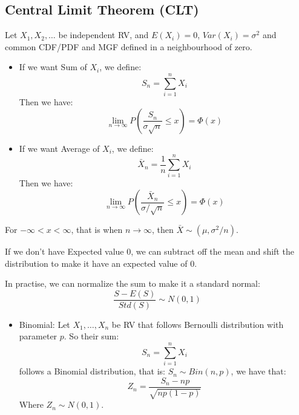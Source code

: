 \documentclass[12pt]{article}
\begin{document}
\begin{multicols*}{4}
    \section{Central Limit Theorem (CLT)}
    Let $X_1, X_2, \dots$ be independent RV, and $E(X_i)=0$, $Var(X_i)=\sigma^2$ and common CDF/PDF and MGF defined in a neighbourhood of zero.
    \begin{itemize}[leftmargin=*]
        \item If we want Sum of $X_i$, we define:
              $$S_n=\sum_{i=1}^nX_i$$
              Then we have:
              $$\lim_{n\to\infty}P\left(\frac{S_n}{\sigma\sqrt{n}}\leq x\right)=\Phi(x)$$
        \item If we want Average of $X_i$, we define:
              $$\bar X_n=\frac{1}{n}\sum_{i=1}^nX_i$$
              Then we have:
              $$\lim_{n\to\infty}P\left(\frac{\bar X_n}{\sigma/\sqrt{n}}\leq x\right)=\Phi(x)$$
    \end{itemize}
    For $-\infty<x<\infty$, that is when $n\to\infty$, then $\bar X\sim(\mu, \sigma^2/n)$.\par
    If we don't have Expected value $0$, we can subtract off the mean and shift the distribution to make it have an expected value of $0$.
    \begin{tcolorbox}[title=Normal Approximation]
        In practise, we can normalize the sum to make it a standard normal:
        $$\frac{S-E(S)}{Std(S)}\sim N(0, 1)$$
        \begin{itemize}[leftmargin=*]
            \item Binomial:
                  Let $X_1, \dots, X_n$ be RV that follows Bernoulli distribution with parameter $p$. So their sum:
                  $$S_n=\sum_{i=1}^nX_i$$
                  follows a Binomial distribution, that is: $S_n\sim Bin(n, p)$, we have that:
                  $$Z_n=\frac{S_n-np}{\sqrt{np(1-p)}}$$
                  Where $Z_n\sim N(0, 1)$.
        \end{itemize}
    \end{tcolorbox}
\end{multicols*}
\end{document}
